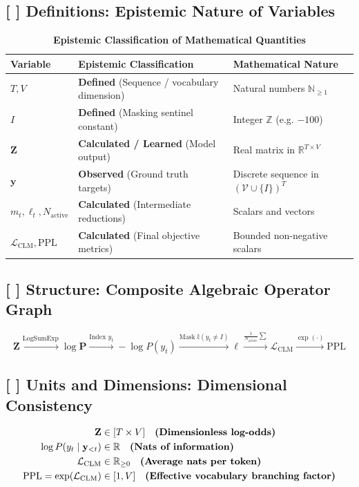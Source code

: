 \documentclass[11pt,a4paper]{article}
\theoremstyle{definition}
\begin{document}
\subsection{[ ] Definitions: Epistemic Nature of Variables}
\begin{table}[h]
\centering
\caption{\textbf{Epistemic Classification of Mathematical Quantities}}
\begin{tabular}{lll}
\toprule
\textbf{Variable} & \textbf{Epistemic Classification} & \textbf{Mathematical Nature} \\
\midrule
$T, V$ & \textbf{Defined} (Sequence / vocabulary dimension) & Natural numbers $\mathbb{N}_{\ge 1}$ \\
$I$ & \textbf{Defined} (Masking sentinel constant) & Integer $\mathbb{Z}$ (e.g. $-100$) \\
$\mathbf{Z}$ & \textbf{Calculated / Learned} (Model output) & Real matrix in $\mathbb{R}^{T \times V}$ \\
$\mathbf{y}$ & \textbf{Observed} (Ground truth targets) & Discrete sequence in $(\mathcal{V} \cup \{I\})^T$ \\
$m_t, \ell_t, N_{\text{active}}$ & \textbf{Calculated} (Intermediate reductions) & Scalars and vectors \\
$\mathcal{L}_{\text{CLM}}, \text{PPL}$ & \textbf{Calculated} (Final objective metrics) & Bounded non-negative scalars \\
\bottomrule
\end{tabular}
\end{table}

\subsection{[ ] Structure: Composite Algebraic Operator Graph}
{\boldmath
\begin{equation}
\mathbf{Z} \xrightarrow{\text{LogSumExp}} \log \mathbf{P} \xrightarrow{\text{Index } y_t} -\log P(y_t) \xrightarrow{\text{Mask } \mathbb{I}(y_t \ne I)} \boldsymbol{\ell} \xrightarrow{\frac{1}{N_{\text{active}}}\sum} \mathcal{L}_{\text{CLM}} \xrightarrow{\exp(\cdot)} \text{PPL}
\end{equation}
}

\subsection{[ ] Units and Dimensions: Dimensional Consistency}
{\boldmath
\begin{align}
\mathbf{Z} &\in [T \times V] \quad \text{\textbf{(Dimensionless log-odds)}} \\
\log P(y_t \mid \mathbf{y}_{<t}) &\in \mathbb{R} \quad \text{\textbf{(Nats of information)}} \\
\mathcal{L}_{\text{CLM}} &\in \mathbb{R}_{\ge 0} \quad \text{\textbf{(Average nats per token)}} \\
\text{PPL} = \exp(\mathcal{L}_{\text{CLM}}) &\in [1, V] \quad \text{\textbf{(Effective vocabulary branching factor)}}
\end{align}
}
\end{document}
